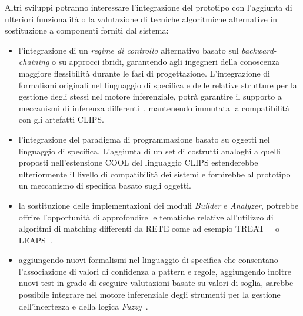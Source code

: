 Altri sviluppi potranno interessare l'integrazione del prototipo con l'aggiunta di ulteriori funzionalità o la valutazione di tecniche algoritmiche alternative in sostituzione a componenti forniti dal sistema:
\begin{itemize}
	\item l'integrazione di un \emph{regime di controllo} alternativo basato sul \emph{backward-chaining} o su approcci ibridi, garantendo agli ingegneri della conoscenza maggiore flessibilità durante le fasi di progettazione. L'integrazione di formalismi originali nel linguaggio di specifica e delle relative strutture per la gestione degli stessi nel motore inferenziale, potrà garantire il supporto a meccanismi di inferenza differenti~\cite{retehibrid}, mantenendo immutata la compatibilità con gli artefatti CLIPS.
	
	\item l'integrazione del paradigma di programmazione basato su oggetti nel linguaggio di specifica. L'aggiunta di un set di costrutti analoghi a quelli proposti nell'estensione COOL del linguaggio CLIPS estenderebbe ulteriormente il livello di compatibilità dei sistemi e fornirebbe al prototipo un meccanismo di specifica basato sugli oggetti.
	
	\item la sostituzione delle implementazioni dei moduli \emph{Builder} e \emph{Analyzer}, potrebbe offrire l'opportunità di approfondire le tematiche relative all'utilizzo di algoritmi di matching differenti da RETE come ad esempio TREAT~\cite{Miranker:1987:TBM:899610}~\cite{Miranker:1987:TBM:1856670.1856678} o LEAPS~\cite{Batory:1994:LA:899216}.	
	
	
	\item aggiungendo nuovi formalismi nel linguaggio di specifica che consentano l'associazione di valori di confidenza a pattern e regole, aggiungendo inoltre nuovi test in grado di eseguire valutazioni basate su valori di soglia, sarebbe possibile integrare nel motore inferenziale degli strumenti per la gestione dell'incertezza e della logica \emph{Fuzzy}~\cite{fuzzyclips}.
\end{itemize}
